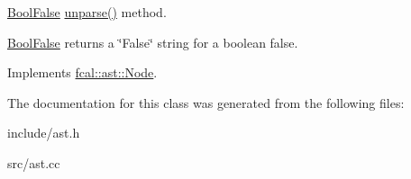 \hyperlink{classfcal_1_1ast_1_1BoolFalse}{Bool\+False} \hyperlink{classfcal_1_1ast_1_1BoolFalse_ae0ed05097f347fb87cdaefd115168f94}{unparse()} method. 

\hyperlink{classfcal_1_1ast_1_1BoolFalse}{Bool\+False} returns a \char`\"{}\+False\char`\"{} string for a boolean false. 

Implements \hyperlink{classfcal_1_1ast_1_1Node_a81865f5a1df593708a39bf492952742a}{fcal\+::ast\+::\+Node}.



The documentation for this class was generated from the following files\+:\begin{DoxyCompactItemize}
\item 
include/ast.\+h\item 
src/ast.\+cc\end{DoxyCompactItemize}
